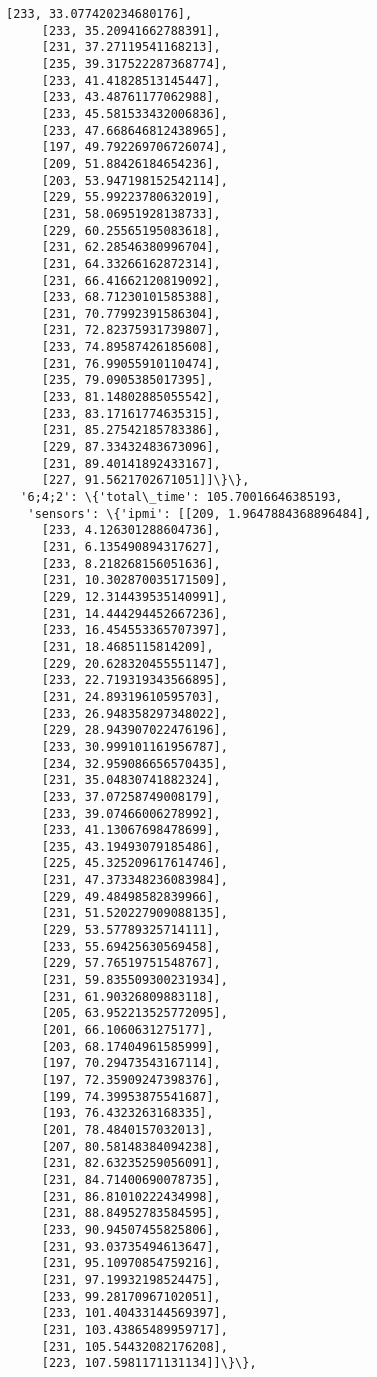 \documentclass[11pt]{article}
\begin{document}
\begin{tcolorbox}[breakable, size=fbox, boxrule=.5pt, pad at break*=1mm, opacityfill=0]
\begin{Verbatim}[commandchars=\\\{\}]
     [233, 33.077420234680176],
     [233, 35.20941662788391],
     [231, 37.27119541168213],
     [235, 39.317522287368774],
     [233, 41.41828513145447],
     [233, 43.48761177062988],
     [233, 45.581533432006836],
     [233, 47.668646812438965],
     [197, 49.792269706726074],
     [209, 51.88426184654236],
     [203, 53.947198152542114],
     [229, 55.99223780632019],
     [231, 58.06951928138733],
     [229, 60.25565195083618],
     [231, 62.28546380996704],
     [231, 64.33266162872314],
     [231, 66.41662120819092],
     [233, 68.71230101585388],
     [231, 70.77992391586304],
     [231, 72.82375931739807],
     [233, 74.89587426185608],
     [231, 76.99055910110474],
     [235, 79.0905385017395],
     [233, 81.14802885055542],
     [233, 83.17161774635315],
     [231, 85.27542185783386],
     [229, 87.33432483673096],
     [231, 89.40141892433167],
     [227, 91.5621702671051]]\}\},
  '6;4;2': \{'total\_time': 105.70016646385193,
   'sensors': \{'ipmi': [[209, 1.9647884368896484],
     [233, 4.126301288604736],
     [231, 6.135490894317627],
     [233, 8.218268156051636],
     [231, 10.302870035171509],
     [229, 12.314439535140991],
     [231, 14.444294452667236],
     [233, 16.454553365707397],
     [231, 18.4685115814209],
     [229, 20.628320455551147],
     [233, 22.719319343566895],
     [231, 24.89319610595703],
     [233, 26.948358297348022],
     [229, 28.943907022476196],
     [233, 30.999101161956787],
     [234, 32.959086656570435],
     [231, 35.04830741882324],
     [233, 37.07258749008179],
     [233, 39.07466006278992],
     [233, 41.13067698478699],
     [235, 43.19493079185486],
     [225, 45.325209617614746],
     [231, 47.373348236083984],
     [229, 49.48498582839966],
     [231, 51.520227909088135],
     [229, 53.57789325714111],
     [233, 55.69425630569458],
     [229, 57.76519751548767],
     [231, 59.835509300231934],
     [231, 61.90326809883118],
     [205, 63.952213525772095],
     [201, 66.1060631275177],
     [203, 68.17404961585999],
     [197, 70.29473543167114],
     [197, 72.35909247398376],
     [199, 74.39953875541687],
     [193, 76.4323263168335],
     [201, 78.4840157032013],
     [207, 80.58148384094238],
     [231, 82.63235259056091],
     [231, 84.71400690078735],
     [231, 86.81010222434998],
     [231, 88.84952783584595],
     [233, 90.94507455825806],
     [231, 93.03735494613647],
     [231, 95.10970854759216],
     [231, 97.19932198524475],
     [233, 99.28170967102051],
     [233, 101.40433144569397],
     [231, 103.43865489959717],
     [231, 105.54432082176208],
     [223, 107.5981171131134]]\}\},

\end{Verbatim}
\end{tcolorbox}
\end{document}
